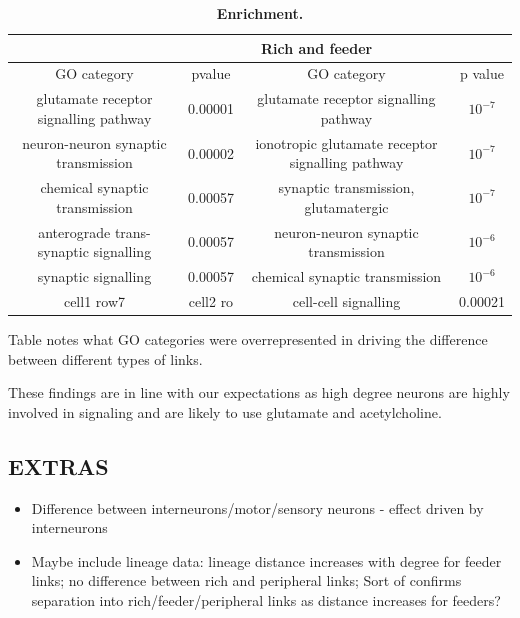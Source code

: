 \documentclass[10pt,letterpaper]{article}
\newlength\savedwidth
\newcommand\thickhline{\noalign{\global\savedwidth\arrayrulewidth\global\arrayrulewidth 2pt}%
\hline
\noalign{\global\arrayrulewidth\savedwidth}}
\begin{document}
\begin{table}[!ht]
\begin{adjustwidth}{-2.25in}{0in} %
\centering
\caption{
{\bf Enrichment.}}
\begin{tabular}{ |c|c|c|c| }
\thickhline
\multicolumn{2}{c}{Connected} & \multicolumn{2}{c}{Rich and feeder} \\ \hline
GO category  & pvalue & GO category  	& p value \\ \thickhline
glutamate receptor signalling pathway 	& 0.00001 & glutamate receptor signalling pathway 			& $10^{-7}$\\ \hline
neuron-neuron synaptic transmission 		& 0.00002 & ionotropic glutamate receptor signalling pathway 	& $10^{-7}$\\ \hline
chemical synaptic transmission		 	& 0.00057 & synaptic transmission, glutamatergic 				& $10^{-7}$\\ \hline
anterograde trans-synaptic signalling 	& 0.00057 & neuron-neuron synaptic transmission 				& $10^{-6}$\\ \hline
synaptic signalling 						& 0.00057 & chemical synaptic transmission 					& $10^{-6}$\\ \hline
cell1 row7 								& cell2 ro& cell-cell signalling 							& 0.00021 \\ \hline
\end{tabular}
\begin{flushleft} Table notes what GO categories were overrepresented in driving the difference between different types of links.
\end{flushleft}
\label{table1}
\end{adjustwidth}
\end{table}


These findings are in line with our expectations as high degree neurons are highly involved in signaling and are likely to use glutamate and acetylcholine.

\subsection*{EXTRAS}
\begin{itemize}
    \item{Difference between interneurons/motor/sensory neurons - effect driven by interneurons}
    \item{Maybe include lineage data: lineage distance increases with degree for feeder links; no difference between rich and peripheral links; Sort of confirms separation into rich/feeder/peripheral links as distance increases for feeders?}
\end{itemize} 
\end{document}
